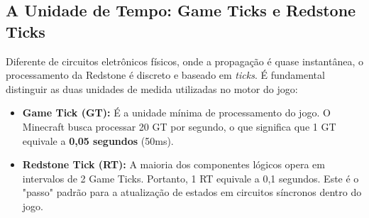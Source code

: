 \subsection{A Unidade de Tempo: Game Ticks e Redstone Ticks}
Diferente de circuitos eletrônicos físicos, onde a propagação é quase instantânea, o processamento da Redstone é discreto e baseado em \textit{ticks}. É fundamental distinguir as duas unidades de medida utilizadas no motor do jogo:

\begin{itemize} 
	\item \textbf{Game Tick (GT):} É a unidade mínima de processamento do jogo. O Minecraft busca processar 20 GT por segundo, o que significa que 1 GT equivale a \textbf{0,05 segundos} (50ms).
	 \item \textbf{Redstone Tick (RT):} A maioria dos componentes lógicos opera em intervalos de 2 Game Ticks. Portanto, 1 RT equivale a 0,1 segundos. Este é o "passo" padrão para a atualização de estados em circuitos síncronos dentro do jogo. 
\end{itemize}